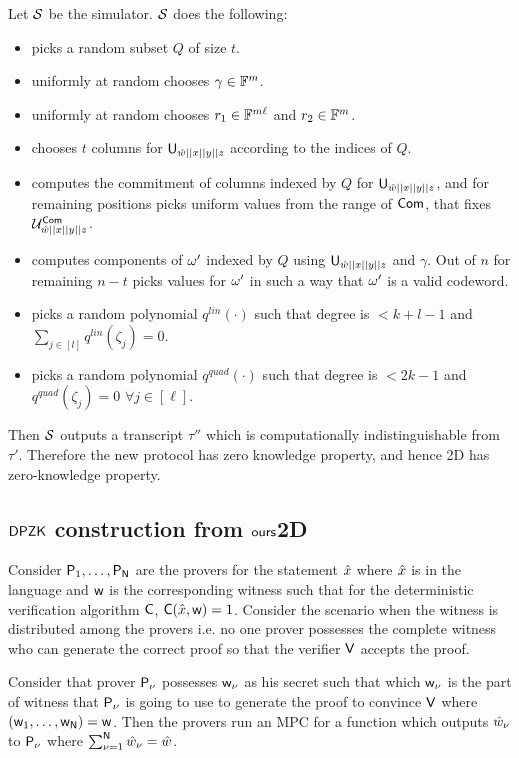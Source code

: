 Let $\mathcal{S}$ be the simulator. $\mathcal{S}$ does the following:
\begin{itemize}
	\item  picks a random subset $Q$ of size $t$.
	\item  uniformly at random chooses $\gamma \in \mathbb{F}^m$.
	\item  uniformly at random chooses $r_1 \in \mathbb{F}^{m\ell}$ and $r_2 \in \mathbb{F}^m$.
	\item  chooses $t$ columns for $\mathsf{U}_{\hat{w}||x||y||z}$ according to the indices of $Q$.
	\item  computes the commitment of columns indexed by $Q$ for $\mathsf{U}_{\hat{w}||x||y||z}$, and for remaining positions picks uniform values from the range of $\mathsf{Com}$, that fixes $\mathcal{U}^{\mathsf{Com}}_{\hat{w}||x||y||z}$.
	\item  computes components of $\omega'$ indexed by $Q$ using $\mathsf{U}_{\hat{w}||x||y||z}$ and $\gamma$. Out of $n$ for remaining $n-t$ picks values for $\omega'$ in such a way that $\omega'$ is a valid codeword.
	\item  picks a random polynomial $q^{lin}(\cdot)$ such that degree is $<k+l-1$ and $\sum_{j\in [l]} q^{lin}(\zeta_j) = 0$.
	\item  picks a random polynomial $q^{quad}(\cdot)$ such that degree is $<2k-1$ and $q^{quad}(\zeta_j) = 0$ $\forall j\in [\ell]$.
\end{itemize} 
Then $\mathcal{S}$ outputs a transcript $\tau''$ which is computationally indistinguishable from $\tau'$. Therefore the new protocol has zero knowledge property, and hence \name2D has zero-knowledge property.

\subsection{$\mathsf{DPZK}$ construction from $\textsf{ours}$2D}

Consider $\mathsf{P}_1, \ldots, \mathsf{P}_{\mathsf{N}}$ are the provers for the statement $\hat{x}$ where $\hat{x}$ is in the language and $\mathsf{w}$ is the corresponding witness such that for the deterministic verification algorithm $\mathsf{C}$, $\mathsf{C}(\hat{x}, \mathsf{w})=1$. Consider the scenario when the witness is distributed among the provers i.e. no one prover possesses the complete witness who can generate the correct proof so that the verifier $\mathsf{V}$ accepts the proof.

Consider that prover $\mathsf{P}_{\nu}$ possesses $\mathsf{w}_{\nu}$ as his secret such that which $\mathsf{w}_{\nu}$ is the part of witness that $\mathsf{P}_{\nu}$ is going to use to generate the proof to convince $\mathsf{V}$ where $(\mathsf{w}_1,\ldots, \mathsf{w}_{\mathsf{N}})=\mathsf{w}$. Then the provers run an MPC for a function which outputs $\hat{w}_{\nu}$ to $\mathsf{P}_{\nu}$ where $\sum_{\nu=1}^{\mathsf{N}}\hat{w}_{\nu} = \hat{w}$.

